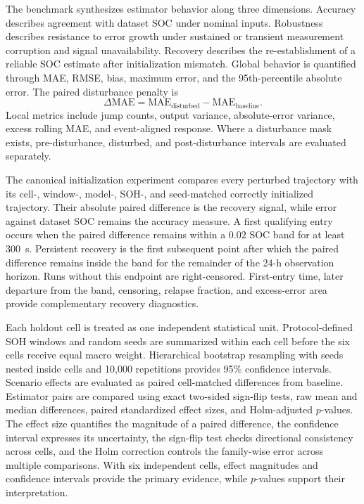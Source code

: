 The benchmark synthesizes estimator behavior along three dimensions. Accuracy describes agreement with dataset SOC under nominal inputs. Robustness describes resistance to error growth under sustained or transient measurement corruption and signal unavailability. Recovery describes the re-establishment of a reliable SOC estimate after initialization mismatch. Global behavior is quantified through MAE, RMSE, bias, maximum error, and the 95th-percentile absolute error. The paired disturbance penalty is
\begin{equation}
    \Delta\mathrm{MAE}=\mathrm{MAE}_{\mathrm{disturbed}}-\mathrm{MAE}_{\mathrm{baseline}}.
    \label{eq:robustness_delta_mae}
\end{equation}
Local metrics include jump counts, output variance, absolute-error variance, excess rolling MAE, and event-aligned response. Where a disturbance mask exists, pre-disturbance, disturbed, and post-disturbance intervals are evaluated separately.

The canonical initialization experiment compares every perturbed trajectory with its cell-, window-, model-, SOH-, and seed-matched correctly initialized trajectory. Their absolute paired difference is the recovery signal, while error against dataset SOC remains the accuracy measure. A first qualifying entry occurs when the paired difference remains within a $0.02$ SOC band for at least 300~s. Persistent recovery is the first subsequent point after which the paired difference remains inside the band for the remainder of the 24-h observation horizon. Runs without this endpoint are right-censored. First-entry time, later departure from the band, censoring, relapse fraction, and excess-error area provide complementary recovery diagnostics.

Each holdout cell is treated as one independent statistical unit. Protocol-defined SOH windows and random seeds are summarized within each cell before the six cells receive equal macro weight. Hierarchical bootstrap resampling with seeds nested inside cells and 10,000 repetitions provides 95\% confidence intervals. Scenario effects are evaluated as paired cell-matched differences from baseline. Estimator pairs are compared using exact two-sided sign-flip tests, raw mean and median differences, paired standardized effect sizes, and Holm-adjusted $p$-values. The effect size quantifies the magnitude of a paired difference, the confidence interval expresses its uncertainty, the sign-flip test checks directional consistency across cells, and the Holm correction controls the family-wise error across multiple comparisons. With six independent cells, effect magnitudes and confidence intervals provide the primary evidence, while $p$-values support their interpretation.

